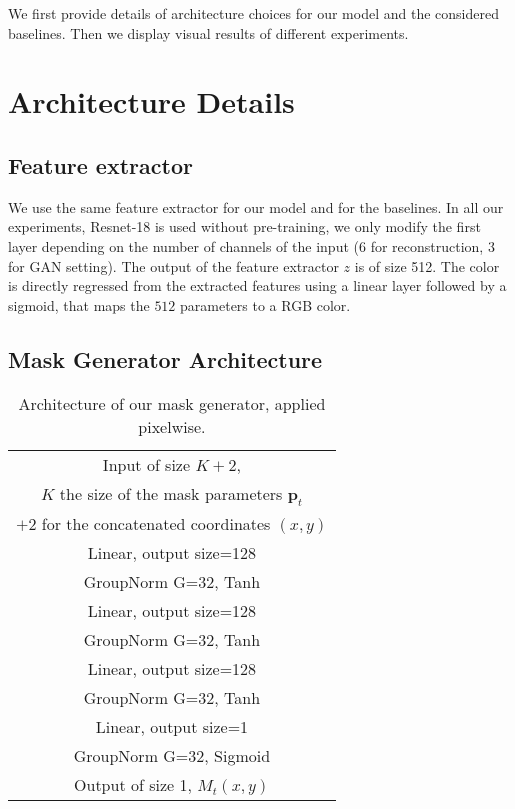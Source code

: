 \documentclass[10pt,twocolumn,letterpaper]{article}
\begin{document}
\clearpage



We first provide details of architecture choices for our model and the considered baselines. Then we display visual results of different experiments. 

\section{Architecture Details}\subsection{Feature extractor}
We use the same feature extractor for our model and for the baselines. In all our experiments, Resnet-18 is used without pre-training, we only modify the first layer depending on the number of channels of the input (6 for reconstruction, 3 for GAN setting). The output of the feature extractor $z$ is of size 512. The color is directly regressed from the extracted features using a linear layer followed by a sigmoid, that maps the $512$ parameters to a RGB color.

\subsection{Mask Generator Architecture}\begin{table}[ht]
	\caption{\label{tab:maskgen_arch} Architecture of our mask generator, applied pixelwise.}
   	\centering
   	\begin{tabular}{c}
		\toprule
	 	Input of size $K+2$,\\
	 	$K$ the size of the mask parameters $\textbf{p}_t$ \\
	    $+2$ for the concatenated coordinates $(x,y)$ \\
       	\midrule
        Linear, output size=128 \\
        GroupNorm G=32, Tanh \\
        \midrule
        Linear, output size=128 \\
        GroupNorm G=32, Tanh \\
		\midrule
		Linear, output size=128 \\
        GroupNorm G=32, Tanh \\
        \midrule
        Linear, output size=1 \\
        GroupNorm G=32, Sigmoid \\
        \midrule
        Output of size 1, $M_t(x,y)$ \\
		\bottomrule
	\end{tabular}
\end{table}
\end{document}
